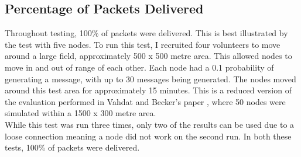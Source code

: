 \documentclass[12pt,a4paper]{report}
\begin{document}
\subsection{Percentage of Packets Delivered}
Throughout testing, 100\% of packets were delivered. This is best illustrated by the test with five nodes. To run this test, I recruited four volunteers to move around a large field, approximately 500 x 500 metre area. This allowed nodes to move in and out of range of each other. Each node had a 0.1 probability of generating a message, with up to 30 messages being generated. The nodes moved around this test area for approximately 15 minutes. This is a reduced version of the evaluation performed in Vahdat and Becker's paper \cite{epidemic}, where 50 nodes were simulated within a 1500 x 300 metre area. \\
While this test was run three times, only two of the results can be used due to a loose connection meaning a node did not work on the second run. In both these tests, 100\% of packets were delivered.

\end{document}
